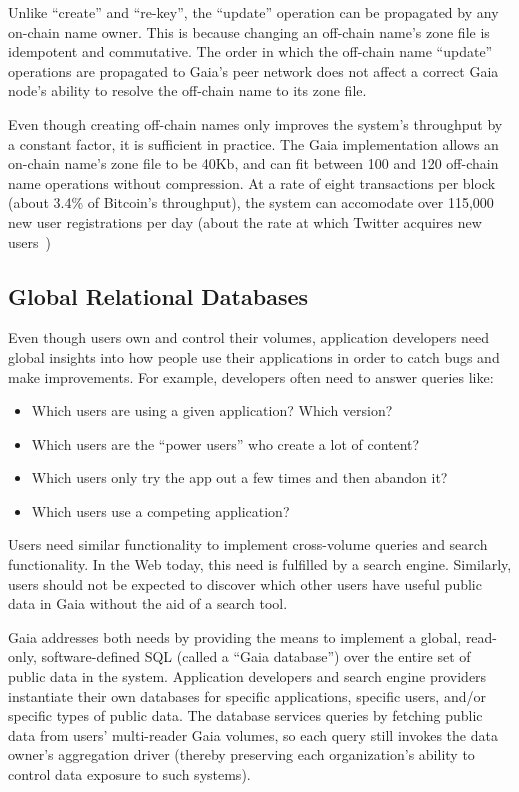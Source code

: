 Unlike ``create'' and ``re-key'', the ``update'' operation can be propagated by
any on-chain name owner.  This is because changing an off-chain name's zone file
is idempotent and commutative.  The order in which the off-chain name ``update''
operations are propagated to Gaia's peer network does not affect a correct
Gaia node's ability to resolve the off-chain name to its zone file.

Even though creating off-chain names only improves the system's throughput by 
a constant factor, it is sufficient in practice.  The Gaia implementation
allows an on-chain name's zone file to be 40Kb, and can fit between
100 and 120 off-chain name operations without compression.
At a rate of eight transactions per block (about 3.4\% of Bitcoin's throughput),
the system can accomodate over 115,000 new user registrations
per day (about the rate at which Twitter acquires
new users~\cite{twitter-user-acquisition})  %

\subsection{Global Relational Databases}

Even though users own and control their volumes, 
application developers need global insights into how people use their
applications in order to catch bugs and make improvements. 
For example, developers often need to answer queries like:

\begin{itemize}
   \item Which users are using a given application?  Which version?
   \item Which users are the ``power users'' who create a lot of content?
   \item Which users only try the app out a few times and then abandon it?
   \item Which users use a competing application?
\end{itemize}

Users need similar functionality to implement cross-volume queries and search
functionality.  In the Web today, this need is fulfilled by a search engine.
Similarly, users should not be expected to discover which other users have
useful public data in Gaia without the aid of a search tool.

Gaia addresses both needs by providing the means to 
implement a global, read-only, software-defined SQL (called a ``Gaia
database'') over the entire set of public data in the system.  Application developers and search
engine providers instantiate their own databases for specific
applications, specific users, and/or specific
types of public data.  The database services queries by fetching
public data from users' multi-reader Gaia volumes, so each query still 
invokes the data owner's aggregation driver (thereby preserving each
organization's ability to control data exposure to such systems).

